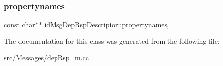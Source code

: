 \subsubsection{\texorpdfstring{propertynames}{propertynames}}
{\footnotesize\ttfamily const char$\ast$$\ast$ id\+Msg\+Dep\+Rsp\+Descriptor\+::propertynames\hspace{0.3cm}{\ttfamily [mutable]}, {\ttfamily [private]}}



The documentation for this class was generated from the following file\+:\begin{DoxyCompactItemize}
\item 
src/\+Messages/\hyperlink{depRsp__m_8cc}{dep\+Rsp\+\_\+m.\+cc}\end{DoxyCompactItemize}
